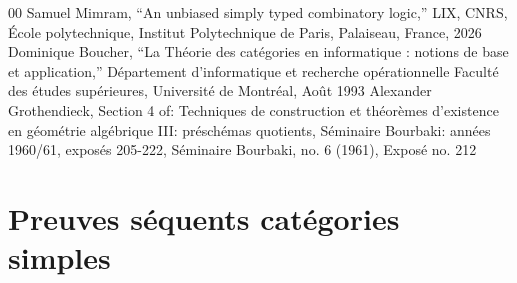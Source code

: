 \documentclass[conference]{IEEEtran}
\begin{document}
\begin{thebibliography}{00}
 Samuel Mimram, ``An unbiased simply typed combinatory logic,'' LIX, CNRS, École polytechnique, Institut Polytechnique de Paris, Palaiseau, France, 2026
 Dominique Boucher, ``La Théorie des catégories en informatique :
notions de base et application,'' Département d'informatique et recherche opérationnelle
Faculté des études supérieures, Université de Montréal, Août 1993
 Alexander Grothendieck, Section 4 of: Techniques de construction et théorèmes d’existence en géométrie algébrique III: préschémas quotients, Séminaire Bourbaki: années 1960/61, exposés 205-222, Séminaire Bourbaki, no. 6 (1961), Exposé no. 212
\end{thebibliography}

\appendices

\section{Preuves séquents catégories simples}
\end{document}
